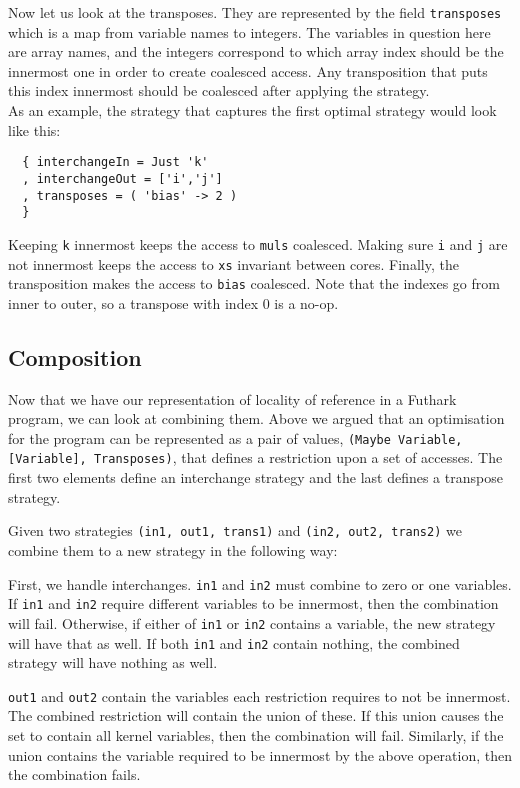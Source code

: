 \documentclass{article}
\begin{document}
Now let us look at the transposes. They are represented by the field \verb`transposes` which is a map from variable names to integers. The variables in question
here are array names, and the integers correspond to which array index should be the innermost one in order to create coalesced access. Any transposition that
puts this index innermost should be coalesced after applying the strategy.\\

As an example, the strategy that captures the first optimal strategy would look like this:
\begin{verbatim}
  { interchangeIn = Just 'k'
  , interchangeOut = ['i','j']
  , transposes = ( 'bias' -> 2 )
  }
\end{verbatim}
Keeping \verb`k` innermost keeps the access to \verb`muls` coalesced. Making sure \verb`i` and \verb`j` are not innermost keeps the access to \verb`xs`
invariant between cores. Finally, the transposition makes the access to \verb`bias` coalesced. Note that the indexes go from inner to outer, so a transpose with
index $0$ is a no-op.

\subsection{Composition}

Now that we have our representation of locality of reference in a Futhark program, we can look at combining them. Above we argued that an optimisation for the
program can be represented as a pair of values, \verb`(Maybe Variable, [Variable], Transposes)`, that defines a restriction upon a set of accesses. The first two
elements define an interchange strategy and the last defines a transpose strategy.

Given two strategies \verb`(in1, out1, trans1)` and \verb`(in2, out2, trans2)` we combine them to a new strategy in the following way:

First, we handle interchanges. \verb`in1` and \verb`in2` must combine to zero or one variables. If \verb`in1` and \verb`in2` require different variables to be
innermost, then the combination will fail. Otherwise, if either of \verb`in1` or \verb`in2` contains a variable, the new strategy will have that as well. If
both \verb`in1` and \verb`in2` contain nothing, the combined strategy will have nothing as well.

\verb`out1` and \verb`out2` contain the variables each restriction requires to not be innermost. The combined restriction will contain the union of these. If
this union causes the set to contain all kernel variables, then the combination will fail. Similarly, if the union contains the variable required to be
innermost by the above operation, then the combination fails.
\end{document}
